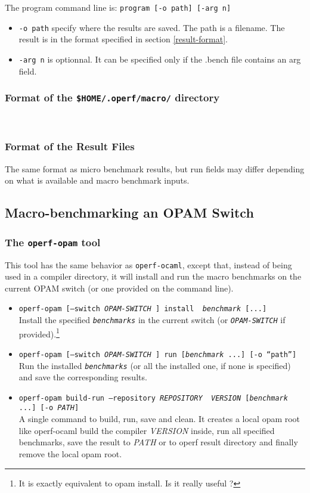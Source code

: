 \documentclass[11pt,a4paper]{article}
\begin{document}
The program command line is:
{\tt program [-o path] [-arg n]}
\begin{itemize}
\item {\tt -o path} specify where the results are saved. The path is a
  filename. The result is in the format specified in section
  \ref{result-format}.
\item {\tt -arg n} is optionnal. It can be specified only if the
  .bench file contains an arg field.
\end{itemize}

\subsubsection{Format of the {\tt \$HOME/.operf/macro/} directory}
~\vspace{4cm}~

\subsubsection{Format of the Result Files}

The same format as micro benchmark results, but run fields may differ
depending on what is available and macro benchmark inputs.
~\vspace{4cm}~

\subsection{Macro-benchmarking an OPAM Switch}

\subsubsection{The {\tt operf-opam} tool}

This tool has the same behavior as {\tt operf-ocaml}, except that,
instead of being used in a compiler directory, it will install and run
the macro benchmarks on the current OPAM switch (or one provided on
the command line).

\begin{itemize}
\item {\tt operf-opam [--switch {\em OPAM-SWITCH} ] install {\em
    benchmark} [...]}\\ Install the specified {\tt\em benchmarks} in
  the current switch (or {\tt\em OPAM-SWITCH} if
  provided).\footnote{It is exactly equivalent to opam install. Is it really useful ?}
\item {\tt operf-opam [--switch {\em OPAM-SWITCH} ] run [{\em benchmark} ...] [-o ``path'']}\\
  Run the installed {\tt\em benchmarks} (or all the installed one, if none
  is specified) and save the corresponding results.
\item {\tt operf-opam build-run --repository {\em REPOSITORY} {\em
    VERSION} [{\em benchmark} ...] [-o {\em PATH}]}\\ A single command
  to build, run, save and clean.  It creates a local opam root like
  operf-ocaml build the compiler {\em VERSION} inside, run all
  specified benchmarks, save the result to {\em PATH} or to operf
  result directory and finally remove the local opam root.
\end{itemize}
\end{document}
